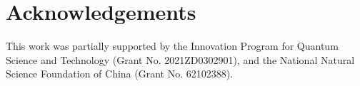 
\section*{Acknowledgements}


This work was partially supported by the Innovation Program for Quantum Science and Technology (Grant No. 2021ZD0302901), and the National Natural Science Foundation of China (Grant No. 62102388).